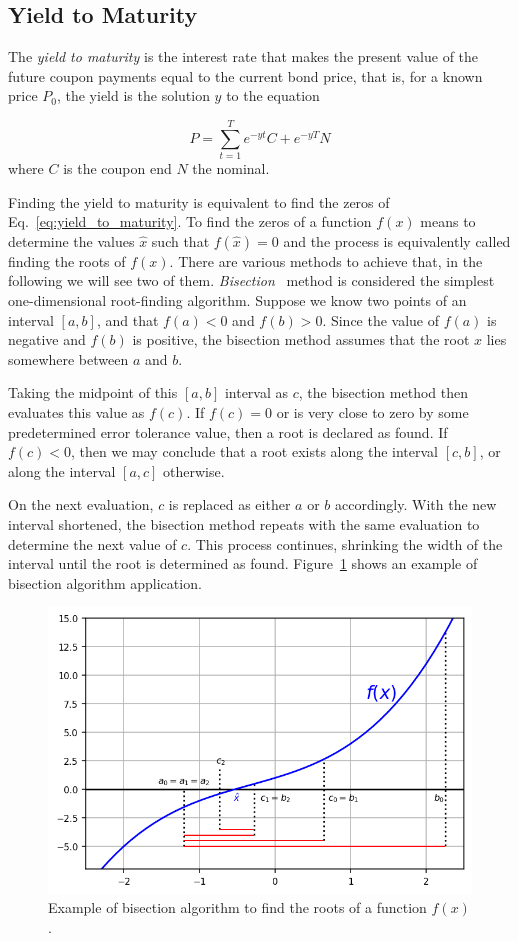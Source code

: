 \subsection{Yield to Maturity}
The \emph{yield to maturity} is the interest rate that makes the present value of the future coupon payments equal to the current bond price, that is, for a known price $P_0$, the yield is the solution $y$ to the equation

\begin{equation}
P = \sum_{t=1}^T e^{-yt}C + e^{-yT}N 
\label{eq:yield_to_maturity}
\end{equation}
where $C$ is the coupon end $N$ the nominal.

Finding the yield to maturity is equivalent to find the zeros of Eq.~\ref{eq:yield_to_maturity}.
To find the zeros of a function $f(x)$ means to determine the values $\hat{x}$ such that $f(\hat{x})=0$ and the process is equivalently called finding the roots of $f(x)$. There are various methods to achieve that, in the following we will see two of them.
\label{sec:root_finding}
\emph{Bisection}~\cite{bib:bisection} method is considered the simplest one-dimensional root-finding algorithm.
Suppose we know two points of an interval $[a,b]$, and that $f (a)< 0$ and $f(b)> 0$.
Since the value of $f(a)$ is negative and $f(b)$ is positive, the bisection method assumes that the root $x$ lies somewhere between $a$ and $b$.

Taking the midpoint of this $[a, b]$ interval as $c$, the bisection method then evaluates this value as $f(c)$.
If $f(c) = 0$ or is very close to zero by some predetermined error tolerance value, then a root is declared as found. If $f(c)< 0$, then we may conclude that a root exists along the interval $[c, b]$, or along the interval $[a,c]$ otherwise.

On the next evaluation, $c$ is replaced as either $a$ or $b$ accordingly. With the new interval shortened, the bisection method repeats with the same evaluation to determine the next value of $c$. This process continues, shrinking the width of the interval until the root is determined as found. Figure~\ref{fig:bisection} shows an example of bisection algorithm application.

\begin{figure}[htbp]
\centering
\includegraphics[width=0.7\linewidth]{figures/bisection}
\caption{Example of bisection algorithm to find the roots of a function $f(x)$.}
\label{fig:bisection}
\end{figure}

